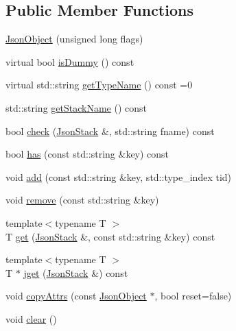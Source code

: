 \subsection*{Public Member Functions}
\begin{DoxyCompactItemize}
\item 
\hyperlink{classHurricane_1_1JsonObject_a57d9c022204b30d4b253c2588f2c1215}{Json\-Object} (unsigned long flags)
\item 
virtual bool \hyperlink{classHurricane_1_1JsonObject_a50c65287719a2de329ac71d24844dc18}{is\-Dummy} () const 
\item 
virtual std\-::string \hyperlink{classHurricane_1_1JsonObject_a947e1c3f8dbae63bb2d086b5b827a2a5}{get\-Type\-Name} () const =0
\item 
std\-::string \hyperlink{classHurricane_1_1JsonObject_a4f17c16c25d15c1da3c5f2d5bdfb99be}{get\-Stack\-Name} () const 
\item 
bool \hyperlink{classHurricane_1_1JsonObject_a7cd25bbf8408c39892eb4e641a21deda}{check} (\hyperlink{classHurricane_1_1JsonStack}{Json\-Stack} \&, std\-::string fname) const 
\item 
bool \hyperlink{classHurricane_1_1JsonObject_a193d12233331484a7dd321a4fd5cde21}{has} (const std\-::string \&key) const 
\item 
void \hyperlink{classHurricane_1_1JsonObject_a39ed04c118b19f1b6010b7f3336c360f}{add} (const std\-::string \&key, std\-::type\-\_\-index tid)
\item 
void \hyperlink{classHurricane_1_1JsonObject_a6435e5a8655a6b42b61d55e7fd673c65}{remove} (const std\-::string \&key)
\item 
{\footnotesize template$<$typename T $>$ }\\T \hyperlink{classHurricane_1_1JsonObject_aff9bf12c689466c693d513e43a62c38a}{get} (\hyperlink{classHurricane_1_1JsonStack}{Json\-Stack} \&, const std\-::string \&key) const 
\item 
{\footnotesize template$<$typename T $>$ }\\T $\ast$ \hyperlink{classHurricane_1_1JsonObject_a387979924e099a418d2567a639ae25cf}{jget} (\hyperlink{classHurricane_1_1JsonStack}{Json\-Stack} \&) const 
\item 
void \hyperlink{classHurricane_1_1JsonObject_a380ea9ac8689e1e9cad892edf0024c08}{copy\-Attrs} (const \hyperlink{classHurricane_1_1JsonObject}{Json\-Object} $\ast$, bool reset=false)
\item 
void \hyperlink{classHurricane_1_1JsonObject_a5f11139263926dbd8fe87b9c4480bdae}{clear} ()

\end{DoxyCompactItemize}
